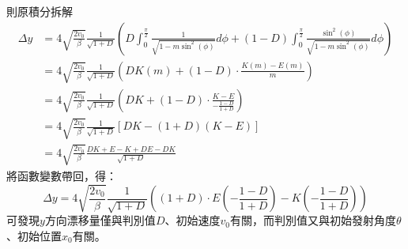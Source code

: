 \documentclass[12pt]{article}
\begin{document}
則原積分拆解
\begin{align*}
    \Delta y&=4\sqrt{\frac{2v_0}{\beta}}\frac{1}{\sqrt{1+D}}\left(D\int_{0}^{\frac{\pi}{2}}{\frac{1}{\sqrt{1-m\sin^2{(\phi)}}}}d\phi+(1-D)\int_{0}^{\frac{\pi}{2}}{\frac{\sin^2{(\phi)}}{\sqrt{1-m\sin^2{(\phi)}}}}d\phi\right)\\
    &=4\sqrt{\frac{2v_0}{\beta}}\frac{1}{\sqrt{1+D}}\left(DK(m)+(1-D)\cdot\frac{K(m)-E(m)}{m}\right)\\
    &=4\sqrt{\frac{2v_0}{\beta}}\frac{1}{\sqrt{1+D}}\left(DK+(1-D)\cdot\frac{K-E}{-\frac{1-D}{1+D}}\right)\\
    &=4\sqrt{\frac{2v_0}{\beta}}\frac{1}{\sqrt{1+D}}[DK-(1+D)(K-E)]\\
    &=4\sqrt{\frac{2v_0}{\beta}}\frac{DK+E-K+DE-DK}{\sqrt{1+D}}
\end{align*}
將函數變數帶回，得：
\begin{equation}
    \Delta y=4\sqrt{\frac{2v_0}{\beta}}\frac{1}{\sqrt{1+D}}\left((1+D)\cdot E\left(-\frac{1-D}{1+D}\right)-K\left(-\frac{1-D}{1+D}\right)\right)
\end{equation}
可發現$y$方向漂移量僅與判別值$D$、初始速度$v_0$有關，而判別值又與初始發射角度$\theta$、初始位置$x_0$有關。
\end{document}
